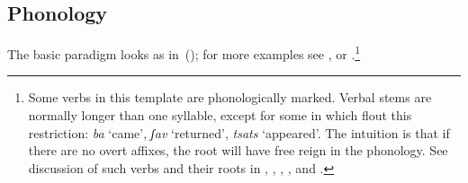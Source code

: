 {		\subsection{Phonology} \label{voice:voice:phono}
The basic paradigm looks as in~(\nextx); for more examples see \cite{schwarzwald08}, \cite{faust12} or \cite{kastner18nllt}.\footnote{Some verbs in this template are phonologically marked. Verbal stems are normally longer than one syllable, except for some in {\tkal} which flout this restriction:
\ex \emph{ba} `came', \emph{ʃav} `returned', \emph{tsats} `appeared'.
\xe
The intuition is that if there are no overt affixes, the root will have free reign in the phonology. See discussion of such verbs and their roots in \cite{ussishkin05}, \cite{laks11}, \cite{borer13oup}, \cite{borer15roots}, \cite{tucker15roots} and \cite{kastner18nllt}.}

\ex
{}
\xe

}
